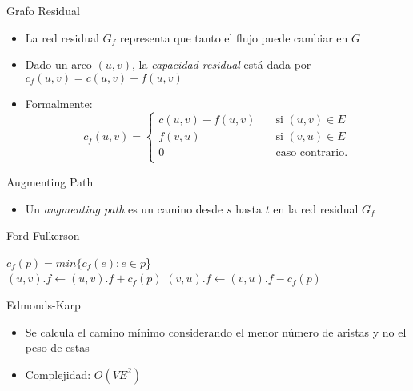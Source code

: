 \documentclass[]{beamer}
\begin{document}
\begin{frame}{Grafo Residual}
  \begin{itemize}
    \item La red residual $G_f$ representa que tanto el flujo puede cambiar en $G$
      \pause
    \item Dado un arco $(u,v)$, la \textit{capacidad residual} est\'a dada por $c_f(u,v) = c(u,v) - f(u,v)$
      \pause
    \item Formalmente:
      \[
        c_f(u,v) =
        \begin{cases}
          \text{$c(u,v) - f(u,v)$} &\quad\text{si $(u,v) \in E$}\\
          \text{$f(v,u)$} &\quad\text{si $(v,u) \in E$} \\
          \text{0} &\quad\text{caso contrario.} \\
        \end{cases}
      \]

  \end{itemize}
\end{frame}

\begin{frame}{Augmenting Path}
  \begin{itemize}
    \item Un \textit{augmenting path} es un camino desde $s$ hasta $t$ en la red residual $G_f$
  \end{itemize}
\end{frame}

\begin{frame}{Ford-Fulkerson}
  \begin{algorithm}[H]
    {
      {$c_f(p) = min\{c_f(e): e \in p$\}} \\
      {
        {
          $(u,v).f \gets (u,v).f + c_f(p)$
        }
        \Else
        {
          $(v,u).f \gets (v,u).f - c_f(p)$
        }
      }
    }
  \end{algorithm}
\end{frame}

\begin{frame}{Edmonds-Karp}
  \begin{itemize}
    \item Se calcula el camino m\'inimo considerando el menor n\'umero de aristas y no el peso de estas
      \pause
    \item Complejidad: $O(VE^2)$
  \end{itemize}
\end{frame}
\end{document}
